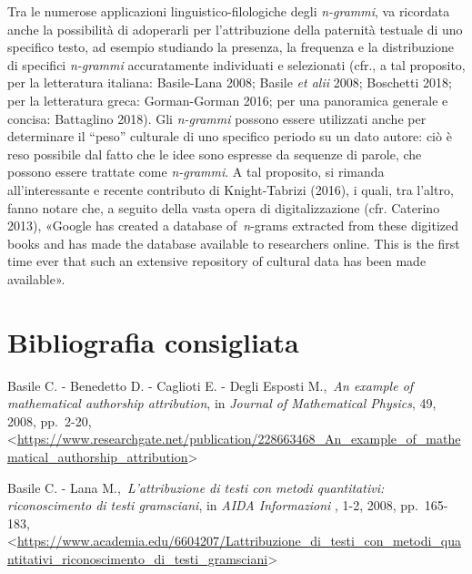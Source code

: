 \documentclass[
  b5paper,
  twoside,
  11pt,
  chapterprefix=false,
  bibliography=totocnumbered,
  parskip=0]{scrbook}
\begin{document}
Tra le numerose applicazioni linguistico-filologiche degli \emph{n-grammi},
va ricordata anche la possibilità di adoperarli per l'attribuzione della
paternità testuale di uno specifico testo, ad esempio studiando la
presenza, la frequenza e la distribuzione di specifici \emph{n-grammi}
accuratamente individuati e selezionati (cfr., a tal proposito, per la
letteratura italiana: Basile-Lana 2008; Basile \emph{et alii} 2008; Boschetti
2018; per la letteratura greca: Gorman-Gorman 2016; per una panoramica
generale e concisa: Battaglino 2018). Gli \emph{n-grammi} possono essere
utilizzati anche per determinare il \enquote{peso} culturale di uno specifico
periodo su un dato autore: ciò è reso possibile dal fatto che le idee
sono espresse da sequenze di parole, che possono essere trattate come
\emph{n-grammi}. A tal proposito, si rimanda all'interessante e recente
contributo di Knight-Tabrizi (2016), i quali, tra l'altro, fanno notare
che, a seguito della vasta opera di digitalizzazione (cfr. Caterino
2013), «Google has created a database of~\emph{n}-grams extracted from these
digitized books and has made the database available to researchers
online. This is the first time ever that such an extensive repository of
cultural data has been made available».

\hypertarget{bibliografia-consigliata-16}{%
\section*{Bibliografia consigliata}\label{bibliografia-consigliata-16}}

Basile C. - Benedetto D. - Caglioti E. - Degli Esposti M.,~\emph{An example
of mathematical authorship attribution}, in \emph{Journal of Mathematical
Physics}, 49, 2008, pp.~2-20,
\textless{}\href{https://www.researchgate.net/publication/228663468_An_example_of_mathematical_authorship_attribution}{{https://www.researchgate.net/publication/228663468\_An\_example\_of\_mathematical\_authorship\_attribution}}\textgreater{}

Basile C. - Lana M.,~\emph{L'attribuzione di testi con metodi quantitativi:
riconoscimento di testi gramsciani}, in \emph{AIDA Informazioni} , 1-2, 2008,
pp.~165-183,
\textless{}\href{https://www.academia.edu/6604207/Lattribuzione_di_testi_con_metodi_quantitativi_riconoscimento_di_testi_gramsciani}{{https://www.academia.edu/6604207/Lattribuzione\_di\_testi\_con\_metodi\_quantitativi\_riconoscimento\_di\_testi\_gramsciani}}\textgreater{}
\end{document}
